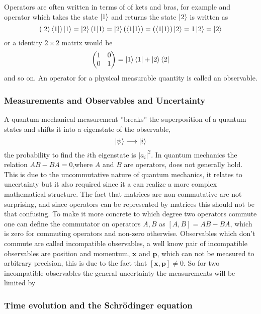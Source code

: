 Operators are often written in terms of of kets and bras, for example and operator which takes the state $\ket{1}$ and returns the state $\ket{2}$ is written as
\begin{equation}
(\ket{2}\bra{1})\ket{1} = \ket{2}\bra{1}\ket{1} = \ket{2}(\bra{1}\ket{1}) = (\bra{1}\ket{1})\ket{2} = 1 \ket{2} = \ket{2}
\end{equation}
or a identity $2\times 2$ matrix would be
\begin{equation}
 \begin{pmatrix}
 1 & 0 \\ 0 & 1
 \end{pmatrix} = \ket{1}\bra{1} + \ket{2}\bra{2} 
\end{equation}
and so on. An operator for a physical measurable quantity is called an observable.

\subsubsection{Measurements and Observables and Uncertainty}
A quantum mechanical measurement ''breaks'' the superposition of a quantum states and shifts it into a eigenstate of the observable,
\begin{equation}
\ket{\psi} \longrightarrow \ket{i}
\end{equation}
the probability to find the $i$th eigenstate is $|a_i|^2$. 
In quantum mechanics the relation $AB - BA = 0$,where $A$ and $B$ are operators, does not generally hold. This is due to the uncommutative nature of quantum mechanics, it relates to uncertainty but it also required since it a can realize a more complex mathematical structure. The fact that matrices are non-commutative are not surprising, and since operators can be represented by matrices this should not be that confusing. 
To make it more concrete to which degree two operators commute one can define  the commutator on operators $A,B$ as $[A,B] = AB - BA$, which is zero for commuting operators and non-zero otherwise. 
Observables which don't commute are called incompatible observables, a well know pair of incompatible observables are position and momentum, $\mathbf{x}$ and $\mathbf{p}$, which can not be measured to arbitrary precision, this is due to the fact that $[\mathbf{x},\mathbf{p}] \neq 0$. So for two incompatible observables the general uncertainty the measurements will be limited by  

\subsubsection{Time evolution and the Schrödinger equation}

